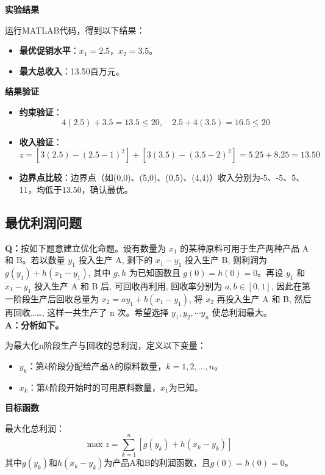 \textbf{实验结果}

运行MATLAB代码，得到以下结果：
\begin{itemize}
    \item \textbf{最优促销水平}：$x_1 = 2.5$，$x_2 = 3.5$。
    \item \textbf{最大总收入}：13.50百万元。
\end{itemize}

\textbf{结果验证}

\begin{itemize}
    \item \textbf{约束验证}：
    \[
    4(2.5) + 3.5 = 13.5 \leq 20, \quad 2.5 + 4(3.5) = 16.5 \leq 20
    \]
    \item \textbf{收入验证}：
    \[
    z = \left[ 3(2.5) - (2.5 - 1)^2 \right] + \left[ 3(3.5) - (3.5 - 2)^2 \right] = 5.25 + 8.25 = 13.50
    \]
    \item \textbf{边界点比较}：边界点（如(0,0)、(5,0)、(0,5)、(4,4)）收入分别为-5、-5、5、11，均低于13.50，确认最优。
\end{itemize}

\subsection{最优利润问题}
\textbf{Q：}按如下题意建立优化命题。设有数量为 $x_1$ 的某种原料可用于生产两种产品 A 和 B。若以数量 $y_1$ 投入生产 A, 剩下的 $x_1 - y_1$ 投入生产 B, 则利润为 $g(y_1) + h(x_1 - y_1)$, 其中 $g, h$ 为已知函数且 $g(0) = h(0) = 0$。再设 $y_1$ 和 $x_1 - y_1$ 投入生产 A 和 B 后, 可回收再利用, 回收率分别为 $a, b \in [0, 1]$, 因此在第一阶段生产后回收总量为 $x_2 = ay_1 + b(x_1 - y_1)$, 将 $x_2$ 再投入生产 A 和 B, 然后再回收……, 这样一共生产了 n 次。希望选择 $y_1, y_2, \cdots y_n$ 使总利润最大。
\\
\textbf{A：分析如下。}

为最大化n阶段生产与回收的总利润，定义以下变量：

\begin{itemize}
    \item $y_k$：第$k$阶段分配给产品A的原料数量，$k=1,2,\dots,n$。
    \item $x_k$：第$k$阶段开始时的可用原料数量，$x_1$为已知。
\end{itemize}

\textbf{目标函数}

最大化总利润：
\[
\max z = \sum_{k=1}^n \left[ g(y_k) + h(x_k - y_k) \right]
\]
其中$g(y_k)$和$h(x_k - y_k)$为产品A和B的利润函数，且$g(0) = h(0) = 0$。


